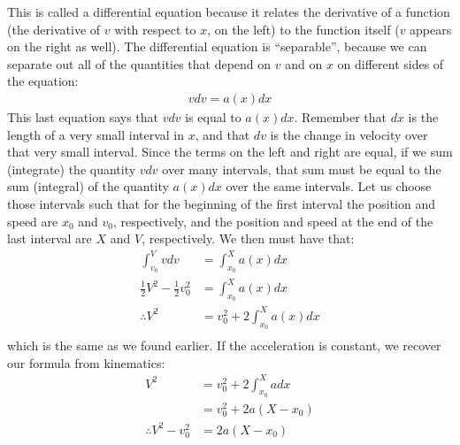 This is called a differential equation because it relates the derivative of a function (the derivative of $v$ with respect to $x$, on the left) to the function itself ($v$ appears on the right as well). The differential equation is ``separable'', because we can separate out all of the quantities that depend on $v$ and on $x$ on different sides of the equation:
\begin{align*}
vdv = a(x)dx
\end{align*} 
This last equation says that $vdv$ is equal to $a(x)dx$. Remember that $dx$ is the length of a very small interval in $x$, and that $dv$ is the change in velocity over that very small interval. Since the terms on the left and right are equal, if we sum (integrate) the quantity $vdv$ over many intervals, that sum must be equal to the sum (integral) of the quantity $a(x)dx$ over the same intervals. Let us choose those intervals such that for the beginning of the first interval the position and speed are $x_0$ and $v_0$, respectively, and the position and speed at the end of the last interval are $X$ and $V$, respectively. We then must have that:
\begin{align*}
\int_{v_0}^{V}vdv&=\int_{x_0}^{X}a(x)dx\\
 \frac{1}{2}V^2 - \frac{1}{2}v_0^2 &= \int_{x_0}^{X}a(x)dx\\
\therefore V^2 &= v_0^2 + 2\int_{x_0}^{X}a(x)dx\\
\end{align*}
which is the same as we found earlier. If the acceleration is constant, we recover our formula from kinematics:
\begin{align*}
V^2 &= v_0^2+ 2\int_{x_0}^{X}adx\\
&=v_0^2+ 2a(X-x_0)\\
\therefore V^2- v_0^2 &= 2a(X-x_0)
\end{align*}

